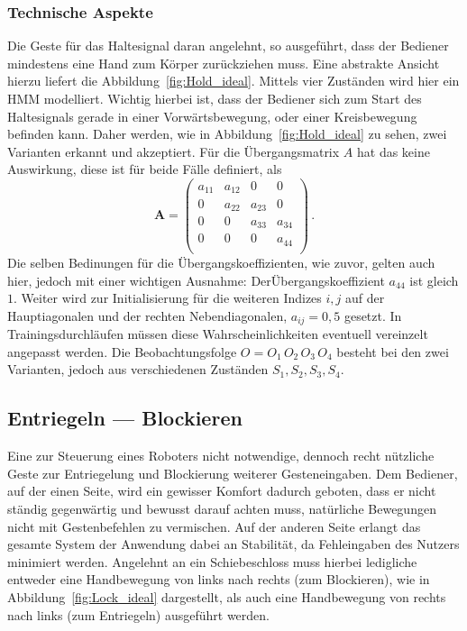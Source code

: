 \subsubsection{Technische Aspekte}
Die Geste f\"ur das Haltesignal daran angelehnt, so ausgef\"uhrt, dass der Bediener mindestens eine Hand zum K\"orper zur\"uckziehen muss. Eine abstrakte Ansicht hierzu liefert die Abbildung~\ref{fig:Hold_ideal}. Mittels vier Zust\"anden wird hier ein \acrshort{HMM} modelliert.
\newline
Wichtig hierbei ist, dass der Bediener sich zum Start des Haltesignals gerade in einer Vorw\"artsbewegung, oder einer Kreisbewegung befinden kann. Daher werden, wie in Abbildung~\ref{fig:Hold_ideal} zu sehen, zwei Varianten erkannt und akzeptiert. F\"ur die \"Ubergangsmatrix $A$ hat das keine Auswirkung, diese ist f\"ur beide F\"alle definiert, als
\begin{equation}
\mathbf{A} = 
\begin{pmatrix}
a_{11} & a_{12} & 0 & 0\\
0 & a_{22} & a_{23} & 0\\
0 & 0 & a_{33} & a_{34}\\
0 & 0 & 0 & a_{44} \\
\end{pmatrix} \, .
\end{equation}
Die selben Bedinungen f\"ur die \"Ubergangskoeffizienten, wie zuvor, gelten auch hier, jedoch mit einer wichtigen Ausnahme: Der\"Ubergangskoeffizient $a_{44}$ ist gleich $1$. Weiter wird zur Initialisierung f\"ur die weiteren Indizes $i, j$ auf der Hauptiagonalen und der rechten Nebendiagonalen, $a_{ij} = 0,5$ gesetzt. In Trainingsdurchl\"aufen m\"ussen diese Wahrscheinlichkeiten eventuell vereinzelt angepasst werden. Die Beobachtungsfolge $O = O_1\, O_2\, O_3\, O_4$ besteht bei den zwei Varianten, jedoch aus verschiedenen Zust\"anden $S_1, S_2, S_3, S_4$.

\subsection{Entriegeln --- Blockieren}
\label{subsec:gesture-lock-unlock}

Eine zur Steuerung eines Roboters nicht notwendige, dennoch recht n\"utzliche Geste zur Entriegelung und Blockierung weiterer Gesteneingaben. Dem Bediener, auf der einen Seite, wird ein gewisser Komfort dadurch geboten, dass er nicht st\"andig gegenw\"artig und bewusst darauf achten muss, nat\"urliche Bewegungen nicht mit Gestenbefehlen zu vermischen. Auf der anderen Seite erlangt das gesamte System der Anwendung dabei an Stabilit\"at, da Fehleingaben des Nutzers minimiert werden.
\newline
Angelehnt an ein Schiebeschloss muss hierbei ledigliche entweder eine Handbewegung von links nach rechts (zum Blockieren), wie in Abbildung~\ref{fig:Lock_ideal} dargestellt, als auch eine Handbewegung von rechts nach links (zum Entriegeln) ausgef\"uhrt werden.

